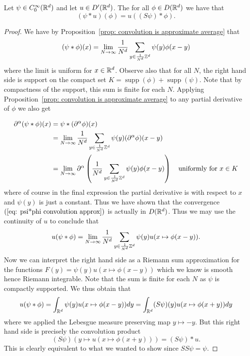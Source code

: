 \documentclass[twoside, a4paper, 10pt]{amsart}
\begin{document}
\begin{lemma} Let $\psi \in C_0^{\infty}(\mathbb{R}^d)$ and let $u \in D'(\mathbb{R}^d)$. The for all $\phi \in  D(\mathbb{R}^d)$ we have that $$(\psi * u)(\phi) = u((S\psi) * \phi).$$

\end{lemma}

\begin{proof} We have by Proposition~\ref{prop: convolution is approximate average} that \begin{align}\label{eq: psi*phi convolution approx} (\psi * \phi)(x) = \lim_{N \to \infty} \frac{1}{N^d} \sum_{y \in \frac{1}{N^d}\mathbb{Z}^d} \psi(y) \phi(x-y) \end{align} where the limit is uniform for $x \in \mathbb{R}^d$. Observe also that for all $N$, the right hand side is support on the compact set $K = \operatorname{supp}(\phi) + \operatorname{supp}(\psi)$. Note that by compactness of the support, this sum is finite for each $N$. Applying Proposition~\ref{prop: convolution is approximate average} to any partial derivative of $\phi$ we also get 

\begin{align*} \partial^{\alpha}(\psi * \phi)(x) &= \psi * (\partial^{\alpha} \phi)(x) \\ &= \lim_{N \to \infty} \frac{1}{N^d} \sum_{y \in \frac{1}{N^d}\mathbb{Z}^d} \psi(y) (\partial^{\alpha}\phi)(x-y) \\&= \lim_{N \to \infty} \partial^{\alpha}\left(\frac{1}{N^d} \sum_{y \in \frac{1}{N^d}\mathbb{Z}^d} \psi(y) \phi(x-y) \right)  \quad\text{uniformly for } x \in K \end{align*} where of course in the final expression the partial derivative is with respect to $x$ and $\psi(y)$ is just a constant. Thus we have shown that the convergence $(\ref{eq: psi*phi convolution approx})$ is actually in $D(\mathbb{R}^d)$. Thus we may use the continuity of $u$ to conclude that $$u(\psi * \phi) = \lim_{N \to \infty} \frac{1}{N^d}  \sum_{y \in \frac{1}{N^d}\mathbb{Z}^d} \psi(y) u(x \mapsto \phi(x-y)).$$ Now we can interpret the right hand side as a Riemann sum approximation for the functions $F(y) = \psi(y)u(x \mapsto \phi(x-y))$ which we know is smooth hence Riemann integrable. Note that the sum is finite for each $N$ as $\psi$ is compactly supported. We thus obtain that $$u(\psi * \phi) = \int_{\mathbb{R}^d} \psi(y)u(x \mapsto \phi(x-y)) dy = \int_{\mathbb{R}^d} (S\psi)(y) u(x \mapsto \phi(x+y)) dy$$ where we applied the Lebesgue measure preserving map $y \mapsto -y$. But this right hand side is precisely the convolution product $$(S\psi)( y \mapsto u(x \mapsto\phi(x+y))) = (S\psi) * u.$$ This is clearly equivalent to what we wanted to show since $SS\psi = \psi.$ \end{proof}
\end{document}
